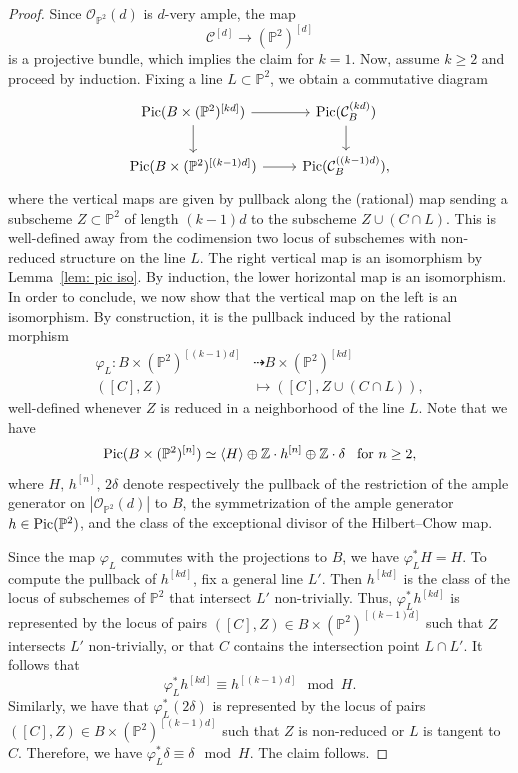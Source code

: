 \documentclass[11pt]{amsart}
\theoremstyle{plain}
\theoremstyle{definition}
\theoremstyle{remark}
\newcommand{\Pic}{\mathop{\rm Pic}\nolimits}
\begin{document}
\begin{proof}
    Since $\mathcal O_{\mathbb P^2}(d)$ is $d$-very ample, the map
    $$\mathcal C^{[d]} \to (\mathbb P^2)^{[d]}$$
    is a projective bundle, which implies the claim for $k = 1$. Now, assume $k \geq 2$ and proceed by induction. Fixing a line $L \subset \mathbb P^2$, we obtain a commutative diagram
 $$\begin{tikzcd}
 {\Pic(B \times (\mathbb P^2)^{[kd]})} \arrow[r] \arrow[d] & \Pic(\mathcal C_B^{(kd)}) \arrow[d] \\
 {\Pic(B \times (\mathbb P^2)^{[(k-1)d]})}  \arrow[r]                                                  & \Pic(\mathcal C_B^{((k-1)d)}),
 \end{tikzcd}$$
where the vertical maps are given by pullback along the (rational) map sending a subscheme $Z \subset \mathbb P^2$ of length $(k-1)d$ to the subscheme $Z \cup (C \cap L)$. This is well-defined away from the codimension two locus of subschemes with non-reduced structure on the line $L$. The right vertical map is an isomorphism by Lemma~\ref{lem: pic iso}. By induction, the lower horizontal map is an isomorphism. In order to conclude, we now show that the vertical map on the left is an isomorphism. By construction, it is the pullback induced by the rational morphism
\begin{align*}
\varphi_L \colon B \times (\mathbb P^2)^{[(k-1)d]} &\dashrightarrow B \times (\mathbb P^2)^{[kd]} \\
([C], Z) &\mapsto ([C], Z \cup (C \cap L)),
\end{align*}
well-defined whenever $Z$ is reduced in a neighborhood of the line $L$.
Note that we have
$$\Pic(B \times (\mathbb P^2)^{[n]}) \simeq \langle H\rangle \oplus \mathbb Z\cdot h^{[n]} \oplus \mathbb Z \cdot \delta \text{ \, for } n \geq 2,$$
where $H,\, h^{[n]},\, 2\delta$ denote respectively the pullback of the restriction of the ample generator on $|\mathcal O_{\mathbb P^2}(d)|$ to $B$, the symmetrization of the ample generator $h \in \Pic(\mathbb P^2)$, and the class of the exceptional divisor of the Hilbert--Chow map.

Since the map $\varphi_L$ commutes with the projections to $B$, we have $\varphi^*_L H = H$. To compute the pullback of $h^{[kd]}$, fix a general line $L'$. Then $h^{[kd]}$ is the class of the locus of subschemes of $\mathbb P^2$ that intersect $L'$ non-trivially. Thus, $\varphi^*_L h^{[kd]}$ is represented by the locus of pairs $([C], Z) \in B \times (\mathbb P^2)^{[(k-1)d]}$ such that $Z$ intersects $L'$ non-trivially, or that $C$ contains the intersection point $L \cap L'$. It follows that 
\[
\varphi^*_L h^{[kd]} \equiv h^{[(k-1)d]} \mod H.
\]
Similarly, we have that $\varphi^*_L (2\delta)$ is represented by the locus of pairs $([C], Z) \in B \times (\mathbb P^2)^{[(k-1)d]}$ such that $Z$ is non-reduced or $L$ is tangent to $C$. Therefore, we have $\varphi_L^* \delta \equiv \delta \mod H.$ The claim follows.
\end{proof}
\end{document}
